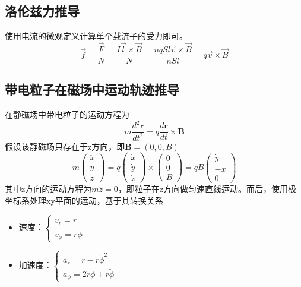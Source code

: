 \subsection{洛伦兹力推导}

使用电流的微观定义计算单个载流子的受力即可。
\begin{equation*}
    \vec{f}=\frac{\vec{F}}{N}=\frac{I\vec{l}\times\vec{B}}{N}
    =\frac{nqSl\vec{v}\times\vec{B}}{nSl}
    =q\vec{v}\times\vec{B}
\end{equation*}

\subsection{带电粒子在磁场中运动轨迹推导}

在静磁场中带电粒子的运动方程为
\begin{equation*}
    m\frac{d^2\mathbf{r}}{dt^2}=q\frac{d\mathbf{r}}{dt}\times\mathbf{B}
\end{equation*}
假设该静磁场只存在于z方向，即$\mathbf{B}=(0,0,B)$
\begin{equation*}
    m\begin{pmatrix}
     \ddot{x}\\\ddot{y}\\\ddot{z}   
    \end{pmatrix}=
    q\begin{pmatrix}
        \dot{x}\\\dot{y}\\\dot{z}
    \end{pmatrix}\times
    \begin{pmatrix}
        0\\0\\B
    \end{pmatrix}=
    qB\begin{pmatrix}
        \dot{y}\\-\dot{x}\\0
    \end{pmatrix}
\end{equation*}
其中z方向的运动方程为$m\ddot{z}=0$，即粒子在z方向做匀速直线运动。而后，使用极坐标系处理xy平面的运动，基于其转换关系
\begin{itemize}
    \item 速度：$\begin{cases}v_r=\dot{r}\\v_\phi=r\dot{\phi}\end{cases}$
    \item 加速度：$\begin{cases}a_r=\ddot{r}-r\dot{\phi}^2\\a_\phi=2\dot{r}\dot{\phi}+r\ddot{\phi}\end{cases}$
\end{itemize}
